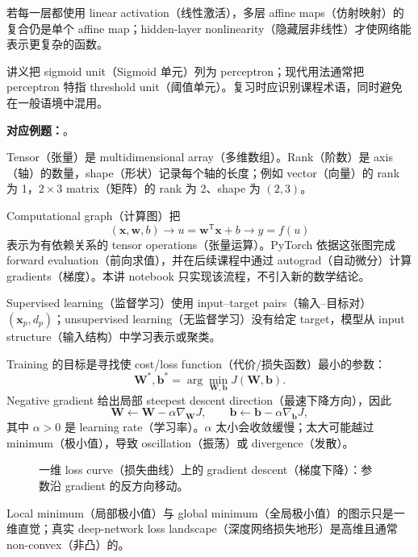 若每一层都使用 linear activation（线性激活），多层 affine maps（仿射映射）的复合仍是单个 affine map；hidden-layer nonlinearity（隐藏层非线性）才使网络能表示更复杂的函数。

讲义把 sigmoid unit（Sigmoid 单元）列为 perceptron；现代用法通常把 perceptron 特指 threshold unit（阈值单元）。复习时应识别课程术语，同时避免在一般语境中混用。

\textbf{对应例题：}。


Tensor（张量）是 multidimensional array（多维数组）。Rank（阶数）是 axis（轴）的数量，shape（形状）记录每个轴的长度；例如 vector（向量）的 rank 为 1，$2\times3$ matrix（矩阵）的 rank 为 2、shape 为 $(2,3)$。

Computational graph（计算图）把
\[
  (\bm x,\bm w,b)\longrightarrow
  u=\bm w^{\mathsf T}\bm x+b\longrightarrow y=f(u)
\]
表示为有依赖关系的 tensor operations（张量运算）。PyTorch 依据这张图完成 forward evaluation（前向求值），并在后续课程中通过 autograd（自动微分）计算 gradients（梯度）。本讲 notebook 只实现该流程，不引入新的数学结论。


Supervised learning（监督学习）使用 input--target pairs（输入--目标对）$(\bm x_p,d_p)$；unsupervised learning（无监督学习）没有给定 target，模型从 input structure（输入结构）中学习表示或聚类。

Training 的目标是寻找使 cost/loss function（代价/损失函数）最小的参数：
\[
  \boxed{\bm W^*,\bm b^*
    =\arg\min_{\bm W,\bm b}J(\bm W,\bm b)}.
\]
Negative gradient 给出局部 steepest descent direction（最速下降方向），因此
\[
  \boxed{\bm W\leftarrow\bm W-\alpha\nabla_{\bm W}J},
  \qquad
  \boxed{\bm b\leftarrow\bm b-\alpha\nabla_{\bm b}J},
\]
其中 $\alpha>0$ 是 learning rate（学习率）。$\alpha$ 太小会收敛缓慢；太大可能越过 minimum（极小值），导致 oscillation（振荡）或 divergence（发散）。

\begin{figure}[htbp]
  \centering
  \resizebox{0.78\textwidth}{!}{}
  \caption{一维 loss curve（损失曲线）上的 gradient descent（梯度下降）：参数沿 gradient 的反方向移动。}
  \label{fig:sc4001-l01-gradient-descent}
\end{figure}

Local minimum（局部极小值）与 global minimum（全局极小值）的图示只是一维直觉；真实 deep-network loss landscape（深度网络损失地形）是高维且通常 non-convex（非凸）的。

